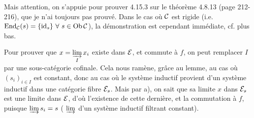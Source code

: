 Mais attention, on s'appuie pour prouver 4.15.3 sur le théorème 4.8.13 (page 212-216), que je n'ai toujours pas prouvé. Dans le cas où $\mathcal{C}$ est rigide (i.e. $\operatorname{End}_{\mathcal{C}}(s) = \{\mathrm{id}_s\}\ \forall\ s \in \operatorname{Ob}\mathcal{C}$), la démonstration est cependant immédiate, cf. plus bas.

Pour prouver que $x = \varinjlim\limits_{I} x_i$ existe dans $\mathcal{E}$, et commute à $f$, on peut remplacer $I$ par une sous-catégorie cofinale. Cela nous ramène, grâce au lemme, au cas où $(s_i)_{i\in I}$ est constant, donc au cas où le système inductif provient d'un système inductif dans une catégorie fibre $\mathcal{E}_s$. Mais par a), on sait que sa limite $x$ dans $\mathcal{E}_s$ est une limite dans $\mathcal{E}$, d'où l'existence de cette dernière, et la commutation à $f$, puisque $\varinjlim s_i = s$ ( $\varinjlim$ d'un système inductif filtrant constant).

